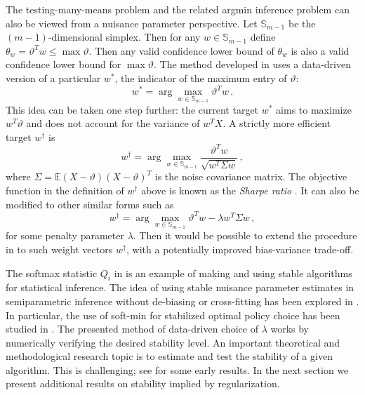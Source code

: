 \documentclass[11pt]{article}
\theoremstyle{plain}
\begin{document}
The testing-many-means problem and the related argmin inference problem can also be viewed from a nuisance parameter perspective.  Let  $\mathbb S_{m-1}$ be the $(m-1)$-dimensional simplex. Then for any $w\in\mathbb S_{m-1}$ define $\theta_w=\vartheta^T w\le \max\vartheta$. Then any valid confidence lower bound of $\theta_w$ is also a valid confidence lower bound for $\max\vartheta$.  The method developed in  uses a data-driven version of a particular $w^*$, the indicator of the maximum entry of $\vartheta$:
$$w^*=\arg\max_{w\in\mathbb S_{m-1}}\vartheta^T w\,.$$
This idea can be taken one step further: the current target $w^*$ aims to maximize $w^T\vartheta$ and does not account for the variance of $w^T X$.  A strictly more efficient target $w^\dag$ is
$$
w^\dag =\arg\max_{w\in\mathbb S_{m-1}}\frac{\vartheta^T w}{\sqrt{w^T\Sigma w}}\,,
$$
where $\Sigma=\mathbb E(X-\vartheta)(X-\vartheta)^T$ is the noise covariance matrix.  The objective function in the definition of $w^\dag$ above is known as the \emph{Sharpe ratio} \citep{palomar2025portfolio}.  It can also be modified to other similar forms such as
$$
w^\dag =\arg\max_{w\in\mathbb S_{m-1}}\vartheta^T w-\lambda w^T\Sigma w\,,
$$
for some penalty parameter $\lambda$.  Then it would be possible to extend the procedure in  to such weight vectors $w^\dag$, with a potentially improved bias-variance trade-off.

The softmax statistic $Q_i$ in  is an example of making and using stable algorithms for statistical inference.  The idea of using stable nuisance parameter estimates in semiparametric inference without de-biasing or cross-fitting has been explored in \cite{chen2022debiased}. In particular, the use of soft-min for stabilized optimal policy choice has been studied in \cite{chen2023inference}.   The presented method of data-driven choice of $\lambda$ works by numerically verifying the desired stability level.  An important theoretical and methodological research topic is to estimate and test the stability of a given algorithm.  This is challenging; see \cite{kim2023black,luo2024algorithmic} for some early results.  In the next section we present additional results on stability implied by regularization.
\end{document}
